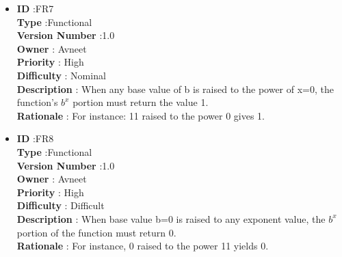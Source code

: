 \documentclass[a4paper,12pt]{report}
\begin{document}
\begin{itemize}
	\item
    \textbf{ID } \hspace{3cm} :FR7  \\
	\textbf{Type } \hspace{2.4cm}  :Functional\\
	\textbf{Version Number} \hspace{0.3cm} :1.0  \\
	\textbf{Owner } \hspace{1.98cm} : Avneet \\
	\textbf{Priority } \hspace{1.75cm} : High\\
	\textbf{Difficulty } \hspace{1.5cm} : Nominal\\
	\textbf{Description }\hspace{1.2cm} : When any base value of b is raised to the power of x=0, the function's $b^x$ portion must return the value 1.\\
	\textbf{Rationale }\hspace{1.6cm} : For instance: 11 raised to the power 0 gives 1.\\

	\item
    \textbf{ID } \hspace{3cm} :FR8  \\
	\textbf{Type } \hspace{2.4cm}  :Functional\\
	\textbf{Version Number} \hspace{0.3cm} :1.0  \\
	\textbf{Owner } \hspace{1.98cm} : Avneet \\
	\textbf{Priority } \hspace{1.75cm} : High\\
	\textbf{Difficulty } \hspace{1.5cm} : Difficult\\
	\textbf{Description }\hspace{1.2cm} : When base value b=0 is raised to any exponent value, the $b^x$ portion of the function must return 0.\\
	\textbf{Rationale }\hspace{1.6cm} : For instance, 0 raised to the power 11 yields 0.\\


\end{itemize}
\end{document}
